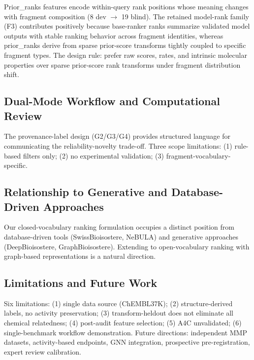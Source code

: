 \documentclass[12pt,letterpaper]{article}
\begin{document}
Prior\_ranks features encode within-query rank positions whose meaning changes with fragment composition (8 dev $\rightarrow$ 19 blind). The retained model-rank family (F3) contributes positively because base-ranker ranks summarize validated model outputs with stable ranking behavior across fragment identities, whereas prior\_ranks derive from sparse prior-score transforms tightly coupled to specific fragment types. The design rule: prefer raw scores, rates, and intrinsic molecular properties over sparse prior-score rank transforms under fragment distribution shift.

\subsection{Dual-Mode Workflow and Computational Review}

The provenance-label design (G2/G3/G4) provides structured language for communicating the reliability-novelty trade-off. Three scope limitations: (1) rule-based filters only; (2) no experimental validation; (3) fragment-vocabulary-specific.

\subsection{Relationship to Generative and Database-Driven Approaches}

Our closed-vocabulary ranking formulation occupies a distinct position from database-driven tools (SwissBioisostere, NeBULA) and generative approaches (DeepBioisostere, GraphBioisostere). Extending to open-vocabulary ranking with graph-based representations is a natural direction.

\subsection{Limitations and Future Work}

Six limitations: (1) single data source (ChEMBL37K); (2) structure-derived labels, no activity preservation; (3) transform-heldout does not eliminate all chemical relatedness; (4) post-audit feature selection; (5) A4C unvalidated; (6) single-benchmark workflow demonstration. Future directions: independent MMP datasets, activity-based endpoints, GNN integration, prospective pre-registration, expert review calibration.

\end{document}
